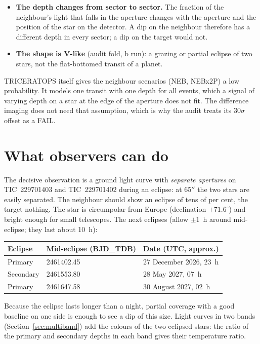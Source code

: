 \begin{itemize}
\item \textbf{The depth changes from sector to sector.} The fraction of the
neighbour's light that falls in the aperture changes with the aperture and
the position of the star on the detector. A dip on the neighbour therefore
has a different depth in every sector; a dip on the target would not.
\item \textbf{The shape is V-like} (audit fold, b run): a grazing or partial
eclipse of two stars, not the flat-bottomed transit of a planet.
\end{itemize}

TRICERATOPS itself gives the neighbour scenarios (NEB, NEBx2P) a low
probability. It models one transit with one depth for all events, which a
signal of varying depth on a star at the edge of the aperture does not
fit. The difference imaging does not need that assumption, which is why
the audit treats its 30$\sigma$ offset as a FAIL.

\section*{What observers can do}

The decisive observation is a ground light curve with \emph{separate
apertures} on TIC~229701403 and TIC~229701402 during an eclipse: at 65$''$
the two stars are easily separated. The neighbour should show an eclipse of
tens of per cent, the target nothing. The star is circumpolar from Europe
(declination $+71.6^\circ$) and bright enough for small telescopes. The
next eclipses (allow $\pm1$~h around mid-eclipse; they last about 10~h):

\begin{center}
\begin{tabular}{@{}lll@{}}
\toprule
Eclipse & Mid-eclipse (BJD\_TDB) & Date (UTC, approx.)\\
\midrule
Primary & 2461402.45 & 27 December 2026, 23~h\\
Secondary & 2461553.80 & 28 May 2027, 07~h\\
Primary & 2461647.58 & 30 August 2027, 02~h\\
\bottomrule
\end{tabular}
\end{center}

Because the eclipse lasts longer than a night, partial coverage with a
good baseline on one side is enough to see a dip of this size. Light curves
in two bands (Section~\ref{sec:multiband}) add the colours of the two
eclipsed stars: the ratio of the primary and secondary depths in each band
gives their temperature ratio.

